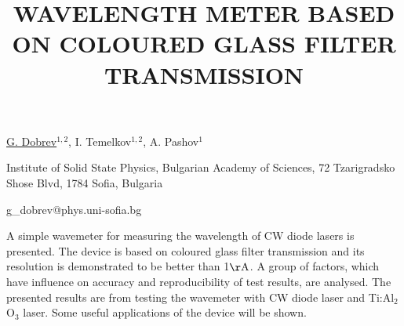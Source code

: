 \title{WAVELENGTH METER BASED ON COLOURED GLASS FILTER TRANSMISSION}

\underline{G. Dobrev}$^{1,2}$, I. Temelkov$^{1,2}$, A. Pashov$^1$ 

{\normalsize{
\vspace{-4mm}\unisofia

\vspace{-4mm} Institute of Solid State Physics, Bulgarian Academy of Sciences, 72 Tzarigradsko Shose Blvd, 1784 Sofia, Bulgaria

\email g\_dobrev@phys.uni-sofia.bg}}

A simple wavemeter for measuring the wavelength of CW diode lasers is presented. The device is based on coloured glass filter transmission and its resolution is demonstrated to be better than 1$\mathrm{\AA}$. A group of factors, which have influence on accuracy and reproducibility of test results, are analysed. The presented results are from testing the wavemeter with CW diode laser and Ti:Al$_2$O$_3$ laser. Some useful applications of the device will be shown.

\vspace{\baselineskip} 